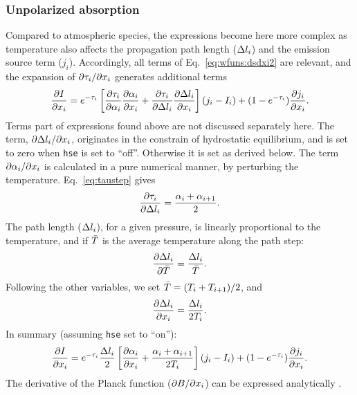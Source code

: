 \subsubsection{Unpolarized absorption}
%
Compared to atmospheric species, the expressions become here more complex as
temperature also affects the propagation path length ($\Delta l_{i}$)
and the emission source term ($j_i$). Accordingly, all terms of
Eq.~\ref{eq:wfuns:dsdxi2} are relevant, and the expansion of
$\partial\tau_{i}/\partial x_{i}$ generates additional terms
\begin{equation}
  \frac{\partial I}{\partial x_{i}} =
   e^{-\tau_{i}}\left[
      \frac{\partial\tau_{i}}{\partial{\alpha}_{i}}
      \frac{\partial{\alpha}_{i}}{\partial x_{i}} + 
      \frac{\partial\tau_{i}}{\partial\Delta l_{i}}
     \frac{\partial\Delta l_{i}}{\partial x_{i}}
  \right](j_i-I_{i})+
  (1-e^{-\tau_{i}})\frac{\partial j_i}{\partial x_{i}}.  
\end{equation}
Terms part of expressions found above are not discussed separately here. The
term, $\partial\Delta l_{i}/\partial x_{i}$, originates in the
constrain of hydrostatic equilibrium, and is set to zero when \verb|hse| 
is set to ``off''. Otherwise it is set as derived below.
The term $\partial{\alpha}_{i}/\partial x_{i}$ is calculated in a pure
numerical manner, by perturbing the temperature. Eq.~\ref{eq:taustep} gives
\begin{equation}
  \frac{\partial \tau_{i}}{\partial \Delta l_{i}} = 
  \frac{{\alpha}_{i}+{\alpha}_{i+1}}{2}. 
\end{equation}
The path length ($\Delta l_{i}$), for a given pressure, is linearly
proportional to the temperature, and if $\bar{T}$ is the average temperature
along the path step:
\begin{equation}
  \frac{\partial \Delta l_{i}}{\partial \bar{T}} =   
                                    \frac{\Delta l_{i}}{\bar{T}}.
  \label{eq:wfuns:ddldtbar}
\end{equation}
Following the other variables, we set $\bar{T}=(T_{i}+T_{i+1})/2$, and
\begin{equation}
  \frac{\partial \Delta l_{i}}{\partial x_{i}} = 
                                    \frac{\Delta l_{i}}{2T_{i}}.
  \label{eq:wfuns:ddldti}
\end{equation}
In summary (assuming \verb|hse| set to ``on''):
\begin{equation}
  \frac{\partial I}{\partial x_{i}} =
   e^{-\tau_{i}}\frac{\Delta l_{i}}{2}\left[
      \frac{\partial{\alpha}_{i}}{\partial x_{i}} + 
  \frac{{\alpha}_{i}+{\alpha}_{i+1}}{2T_{i}}
  \right](j_i-I_{i})+
  (1-e^{-\tau_{i}})\frac{\partial j_i}{\partial x_{i}}.  
\end{equation}
The derivative of the Planck function ($\partial B/\partial x_{i}$) can
be expressed analytically \citep{eriksson:studi:02}. 


